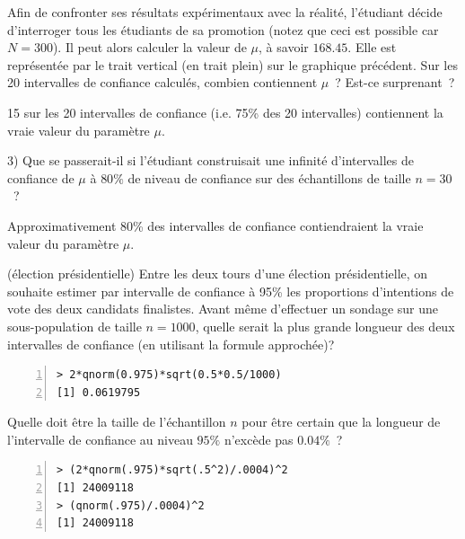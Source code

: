 \documentclass[10pt]{report}
\begin{document}
\begin{exercice}
Afin de confronter ses r{\'e}sultats exp{\'e}rimentaux avec la r{\'e}alit{\'e}, l'{\'e}tudiant d{\'e}cide d'interroger tous les {\'e}tudiants de sa promotion (notez que ceci est possible car $N=300$). Il peut alors calculer la valeur de $\mu$, {\`a} savoir $168.45$. Elle est repr{\'e}sent{\'e}e par le trait vertical (en trait plein) sur le graphique pr{\'e}c{\'e}dent. Sur les 20 intervalles de confiance calcul{\'e}s, combien contiennent $\mu$~? Est-ce surprenant~? 


\begin{Correction}
15 sur les 20 intervalles de confiance (i.e. 75\% des 20 intervalles) contiennent la vraie valeur du paramètre $\mu$.
\end{Correction}



3) Que se passerait-il si l'{\'e}tudiant construisait une infinit{\'e} d'intervalles de confiance de $\mu$ {\`a} $80\%$ de niveau de confiance sur des {\'e}chantillons de taille $n=30$~? \\


\begin{Correction}
Approximativement 80\% des intervalles de confiance contiendraient la vraie valeur du paramètre $\mu$.
\end{Correction}


\end{exercice}

\begin{exercice} (élection présidentielle) 
Entre les deux tours d'une {\'e}lection pr{\'e}sidentielle, on souhaite estimer par intervalle de confiance {\`a} 95\% les proportions d'intentions de vote des deux candidats finalistes. Avant m{\^e}me d'effectuer un sondage sur une sous-population de taille $n=1000$, quelle serait la plus grande longueur des deux intervalles de confiance (en utilisant la formule approch{\'e}e)? \\

\IndicR
\begin{Verbatim}[frame=leftline,fontfamily=tt,fontshape=n,numbers=left]
> 2*qnorm(0.975)*sqrt(0.5*0.5/1000)
[1] 0.0619795
\end{Verbatim}


Quelle doit {\^e}tre la taille de l'{\'e}chantillon $n$  pour {\^e}tre certain que
la longueur de l'intervalle de confiance au niveau $95\%$ n'exc{\`e}de pas
$0.04\%$~? \\


\IndicR
\begin{Verbatim}[frame=leftline,fontfamily=tt,fontshape=n,numbers=left]
> (2*qnorm(.975)*sqrt(.5^2)/.0004)^2
[1] 24009118
> (qnorm(.975)/.0004)^2
[1] 24009118
\end{Verbatim}


\end{exercice}
\end{document}

